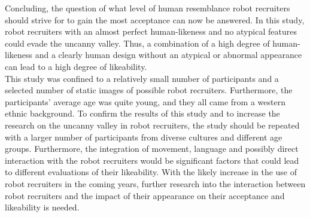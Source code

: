 Concluding, the question of what level of human resemblance robot recruiters should strive for to gain the most acceptance can now be answered. In this study, robot recruiters with an almost perfect human-likeness and no atypical features could evade the uncanny valley. Thus, a combination of a high degree of human-likeness and a clearly human design without an atypical or abnormal appearance can lead to a high degree of likeability.\\
This study was confined to a relatively small number of participants and a selected number of static images of possible robot recruiters. Furthermore, the participants' average age was quite young, and they all came from a western ethnic background. To confirm the results of this study and to increase the research on the uncanny valley in robot recruiters, the study should be repeated with a larger number of participants from diverse cultures and different age groups. Furthermore, the integration of movement, language and possibly direct interaction with the robot recruiters would be significant factors that could lead to different evaluations of their likeability. With the likely increase in the use of robot recruiters in the coming years, further research into the interaction between robot recruiters and the impact of their appearance on their acceptance and likeability is needed. 